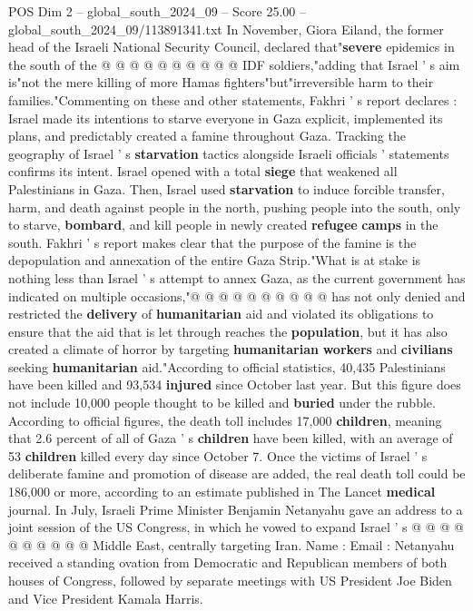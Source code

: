 \begin{textsample}{POS Dim 2 – global\_south\_2024\_09 – Score 25.00 – global\_south\_2024\_09/113891341.txt}
In November, Giora Eiland, the former head of the Israeli National Security Council, declared that"\textbf{severe} epidemics in the south of the @ @ @ @ @ @ @ @ @ @ IDF soldiers,"adding that Israel ' s aim is"not the mere killing of more Hamas fighters"but"irreversible harm to their families."Commenting on these and other statements, Fakhri ' s report declares : Israel made its intentions to starve everyone in Gaza explicit, implemented its plans, and predictably created a famine throughout Gaza.
Tracking the geography of Israel ' s \textbf{starvation} tactics alongside Israeli officials ' statements confirms its intent.
Israel opened with a total \textbf{siege} that weakened all Palestinians in Gaza.
Then, Israel used \textbf{starvation} to induce forcible transfer, harm, and death against people in the north, pushing people into the south, only to starve, \textbf{bombard}, and kill people in newly created \textbf{refugee} \textbf{camps} in the south.
Fakhri ' s report makes clear that the purpose of the famine is the depopulation and annexation of the entire Gaza Strip."What is at stake is nothing less than Israel ' s attempt to annex Gaza, as the current government has indicated on multiple occasions,"@ @ @ @ @ @ @ @ @ @ has not only denied and restricted the \textbf{delivery} of \textbf{humanitarian} aid and violated its obligations to ensure that the aid that is let through reaches the \textbf{population}, but it has also created a climate of horror by targeting \textbf{humanitarian} \textbf{workers} and \textbf{civilians} seeking \textbf{humanitarian} aid."According to official statistics, 40,435 Palestinians have been killed and 93,534 \textbf{injured} since October last year.
But this figure does not include 10,000 people thought to be killed and \textbf{buried} under the rubble.
According to official figures, the death toll includes 17,000 \textbf{children}, meaning that 2.6 percent of all of Gaza ' s \textbf{children} have been killed, with an average of 53 \textbf{children} killed every day since October 7.
Once the victims of Israel ' s deliberate famine and promotion of disease are added, the real death toll could be 186,000 or more, according to an estimate published in The Lancet \textbf{medical} journal.
In July, Israeli Prime Minister Benjamin Netanyahu gave an address to a joint session of the US Congress, in which he vowed to expand Israel ' s @ @ @ @ @ @ @ @ @ @ Middle East, centrally targeting Iran.
Name : Email : Netanyahu received a standing ovation from Democratic and Republican members of both houses of Congress, followed by separate meetings with US President Joe Biden and Vice President Kamala Harris.

\end{textsample}
